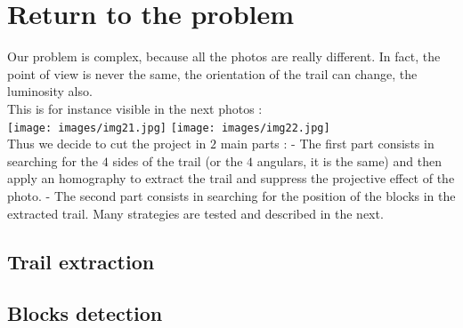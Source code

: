 \documentclass{article}
\begin{document}
\section{Return to the problem}

Our problem is complex, because all the photos are really different. In fact, the point of view is never the same, the orientation of the trail can change, the luminosity also.\\
This is for instance visible in the next photos :\\
\texttt{[image: images/img21.jpg]} 
\texttt{[image: images/img22.jpg]}\\
Thus we decide to cut the project in $2$ main parts :
- The first part consists in searching for the $4$ sides of the trail (or the $4$ angulars, it is the same) and then apply an homography to extract the trail and suppress the projective effect of the photo.
- The second part consists in searching for the position of the blocks in the extracted trail. Many strategies are tested and described in the next.

\subsection{Trail extraction}

\subsection{Blocks detection}
\end{document}
